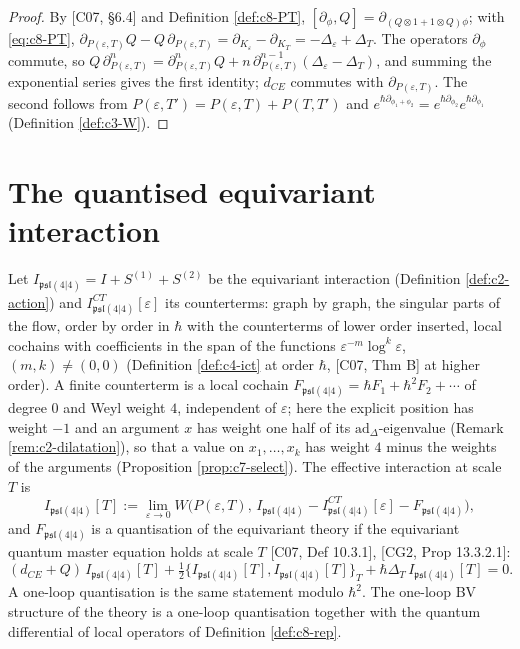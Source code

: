\begin{proof}
By [C07, §6.4] and Definition \ref{def:c8-PT}, $[\partial_\phi,Q]=\partial_{(Q\otimes1+1\otimes Q)\phi}$; with \eqref{eq:c8-PT}, $\partial_{P(\varepsilon,T)}Q-Q\,\partial_{P(\varepsilon,T)}=\partial_{K_\varepsilon}-\partial_{K_T}=-\Delta_\varepsilon+\Delta_T$. The operators $\partial_\phi$ commute, so $Q\,\partial_{P(\varepsilon,T)}^n=\partial_{P(\varepsilon,T)}^nQ+n\,\partial_{P(\varepsilon,T)}^{n-1}(\Delta_\varepsilon-\Delta_T)$, and summing the exponential series gives the first identity; $d_{CE}$ commutes with $\partial_{P(\varepsilon,T)}$. The second follows from $P(\varepsilon,T')=P(\varepsilon,T)+P(T,T')$ and $e^{\hbar\partial_{\phi_1+\phi_2}}=e^{\hbar\partial_{\phi_2}}e^{\hbar\partial_{\phi_1}}$ (Definition \ref{def:c3-W}).
\end{proof}

\section{The quantised equivariant interaction}

\begin{definition}
\label{def:c8-quant}
Let $I_{\mathfrak{psl}(4|4)}=I+S^{(1)}+S^{(2)}$ be the equivariant interaction (Definition \ref{def:c2-action}) and $I^{CT}_{\mathfrak{psl}(4|4)}[\varepsilon]$ its counterterms: graph by graph, the singular parts of the flow, order by order in $\hbar$ with the counterterms of lower order inserted, local cochains with coefficients in the span of the functions $\varepsilon^{-m}\log^k\varepsilon$, $(m,k)\neq(0,0)$ (Definition \ref{def:c4-ict} at order $\hbar$, [C07, Thm B] at higher order). A finite counterterm is a local cochain $F_{\mathfrak{psl}(4|4)}=\hbar F_1+\hbar^2F_2+\cdots$ of degree $0$ and Weyl weight $4$, independent of $\varepsilon$; here the explicit position has weight $-1$ and an argument $x$ has weight one half of its $\mathrm{ad}_\Delta$-eigenvalue (Remark \ref{rem:c2-dilatation}), so that a value on $x_1,\dots,x_k$ has weight $4$ minus the weights of the arguments (Proposition \ref{prop:c7-select}). The effective interaction at scale $T$ is
\begin{equation}
I_{\mathfrak{psl}(4|4)}[T]:=\lim_{\varepsilon\to0}W\big(P(\varepsilon,T),\,I_{\mathfrak{psl}(4|4)}-I^{CT}_{\mathfrak{psl}(4|4)}[\varepsilon]-F_{\mathfrak{psl}(4|4)}\big),
\label{eq:c8-IT}
\end{equation}
and $F_{\mathfrak{psl}(4|4)}$ is a quantisation of the equivariant theory if the equivariant quantum master equation holds at scale $T$ [C07, Def 10.3.1], [CG2, Prop 13.3.2.1]:
\begin{equation}
(d_{CE}+Q)\,I_{\mathfrak{psl}(4|4)}[T]+\tfrac12\big\{I_{\mathfrak{psl}(4|4)}[T],I_{\mathfrak{psl}(4|4)}[T]\big\}_T+\hbar\Delta_T\,I_{\mathfrak{psl}(4|4)}[T]=0 .
\label{eq:c8-qme}
\end{equation}
A one-loop quantisation is the same statement modulo $\hbar^2$. The one-loop BV structure of the theory is a one-loop quantisation together with the quantum differential of local operators of Definition \ref{def:c8-rep}.
\end{definition}

